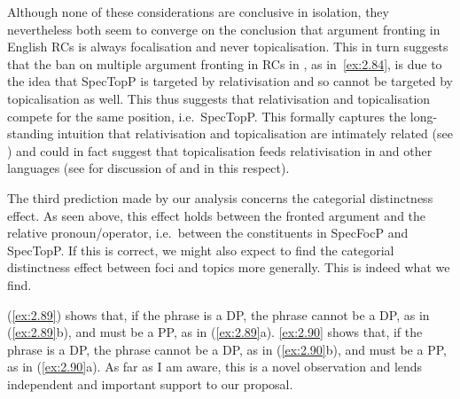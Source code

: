\documentclass[output=paper]{langsci/langscibook}
\begin{document}
\ea\label{ex:2.87}
    \z
\ex\label{ex:2.88}
    \z
\z
Although none of these considerations are conclusive in isolation, they
nevertheless both seem to converge on the conclusion that argument fronting in
English \glspl{RC} is always focalisation and never topicalisation. This in turn
suggests that the ban on multiple argument fronting in \glspl{RC} in , as
in~\eqref{ex:2.84}, is due to the idea that SpecTopP is targeted by
relativisation and so cannot be targeted by topicalisation as well. This thus
suggests that relativisation and topicalisation compete for the same position,
i.e.\ SpecTopP\@.  This formally captures the long-standing intuition that
relativisation and topicalisation are intimately related (see
\citealt{Abels2012a,Bianchi1999,Kuno1973,Kuno1976,Williams2011}) and could in
fact suggest that topicalisation feeds relativisation in  and other
languages (see \citealt{Douglas2016} for discussion of  and
 in this respect).

The third prediction made by our analysis concerns the categorial distinctness
effect. As seen above, this effect holds between the fronted argument and the
relative pronoun/operator, i.e.\ between the constituents in SpecFocP and
SpecTopP\@. If this is correct, we might also expect to find the categorial
distinctness effect between foci and topics more generally. This is indeed what
we find.

\ea\label{ex:2.89}
    \z
\ex\label{ex:2.90}
    \z
\z
(\ref{ex:2.89}) shows that, if the  phrase is a DP, the
 phrase cannot be a DP, as in (\ref{ex:2.89}b), and must be a
PP, as in (\ref{ex:2.89}a). \eqref{ex:2.90} shows that, if the
 phrase is a DP, the  phrase cannot be a DP, as in
(\ref{ex:2.90}b), and must be a PP, as in (\ref{ex:2.90}a). As far as I
am aware, this is a novel observation and lends independent and important
support to our proposal.
\end{document}
